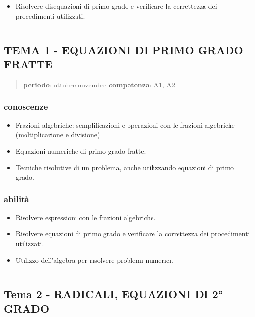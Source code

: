 \documentclass[12pt, a4paper]{exam}
\begin{document}
\begin{itemize}

\item
  Risolvere disequazioni di primo grado e verificare la correttezza dei
  procedimenti utilizzati.
\end{itemize}

\bigskip
\hrule
\bigskip

\subsection*{TEMA 1 - EQUAZIONI DI PRIMO GRADO FRATTE}

\begin{quote}
\textbf{periodo}: ottobre-novembre \textbf{competenza}: A1, A2
\end{quote}


\subsubsection*{conoscenze}

\begin{itemize}
\item
  Frazioni algebriche: semplificazioni e operazioni con le frazioni
  algebriche (moltiplicazione e divisione)
\item
  Equazioni numeriche di primo grado fratte.
\item
  Tecniche risolutive di un problema, anche utilizzando equazioni di
  primo grado.
\end{itemize}


\subsubsection*{abilità}

\begin{itemize}
\item
  Risolvere espressioni con le frazioni algebriche.
\item
  Risolvere equazioni di primo grado e verificare la correttezza dei
  procedimenti utilizzati.
\item
  Utilizzo dell'algebra per risolvere problemi numerici.
\end{itemize}

\bigskip
\hrule
\bigskip

\subsection*{Tema 2 - RADICALI, EQUAZIONI DI 2° GRADO}
\end{document}
